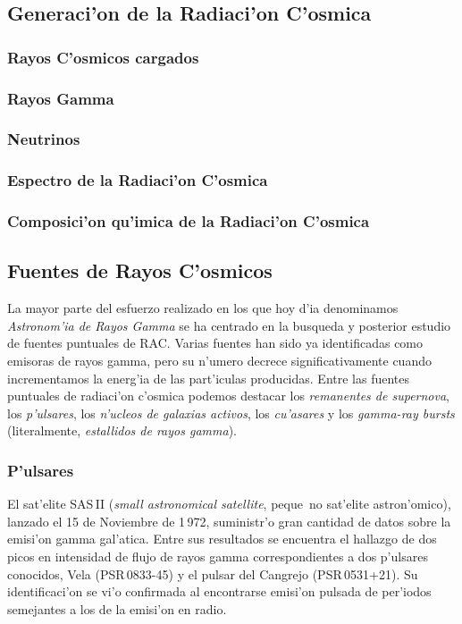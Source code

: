 \subsection{Generaci'on de la Radiaci'on C'osmica}

\subsubsection{Rayos C'osmicos cargados}

\subsubsection{Rayos Gamma}

\subsubsection{Neutrinos}

\subsubsection{Espectro de la Radiaci'on C'osmica}

\subsubsection{Composici'on qu'imica de la Radiaci'on C'osmica}

\subsection{Fuentes de Rayos C'osmicos}

La mayor parte del esfuerzo realizado en los que hoy d'ia denominamos
\emph{Astronom'ia de Rayos Gamma} se ha centrado en la busqueda y
posterior estudio de fuentes puntuales de RAC. Varias fuentes han sido
ya identificadas como emisoras de rayos gamma, pero su n'umero decrece
significativamente cuando incrementamos la energ'ia de las part'iculas
producidas. Entre las fuentes puntuales de radiaci'on c'osmica podemos
destacar los \emph{remanentes de supernova}, los \emph{p'ulsares}, los
\emph{n'ucleos de galaxias activos}, los \emph{cu'asares} y los
\emph{gamma-ray bursts} (literalmente, \emph{estallidos de
rayos gamma}).
 
\subsubsection{P'ulsares}
%
El sat'elite SAS\,II (\emph{small astronomical satellite}, peque~no
sat'elite astron'omico), lanzado el 15 de Noviembre de 1\,972,
suministr'o gran cantidad de datos sobre la emisi'on gamma
gal'atica. Entre sus resultados se encuentra el hallazgo de dos picos
en intensidad de flujo de rayos gamma correspondientes a dos p'ulsares
conocidos, Vela (PSR\,0833-45) y el pulsar del Cangrejo
(PSR\,0531+21). Su identificaci'on se vi'o confirmada al encontrarse
emisi'on pulsada de per'iodos semejantes a los de la emisi'on en
radio.

